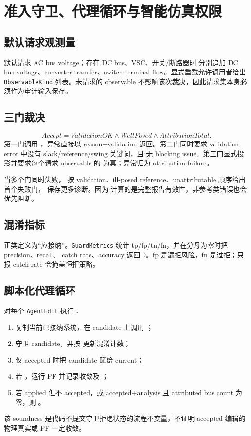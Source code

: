 \section{准入守卫、代理循环与智能仿真权限}

\subsection{默认请求观测量}

 默认请求 AC bus voltage；存在 DC bus、VSC、开关/断路器时
分别追加 DC bus voltage、converter transfer、switch terminal flow。显式重载允许调用者给出
\texttt{ObservableKind} 列表。未请求的 observable 不影响该次裁决，因此请求集本身必须作为审计输入保存。

\subsection{三门裁决}

\begin{equation}
Accept=ValidationOK\land WellPosed\land AttributionTotal.
\end{equation}
第一门调用 ，异常直接以 reason=validation 返回。第二门同时要求 validation error
中没有 slack/reference/swing 关键词，且
 无 blocking issue。第三门显式投影并要求每个请求
observable 的  为真；异常归为 attribution failure。

当多个门同时失败， 按 validation、ill-posed reference、unattributable 顺序给出首个失败门，
 保存更多诊断。因为  计算的是完整报告有效性，非参考类错误也会优先阻断。

\subsection{混淆指标}

正类定义为“应接纳”。\texttt{GuardMetrics} 统计 tp/fp/tn/fn，并在分母为零时把 precision、recall、
catch rate、accuracy 返回 0。fp 是漏拒风险，fn 是过拒；只报 catch rate 会掩盖恒拒策略。

\subsection{脚本化代理循环}

 对每个 \texttt{AgentEdit} 执行：
\begin{enumerate}
  \item 复制当前已接纳系统，在 candidate 上调用 ；
  \item 守卫 candidate，并按  更新混淆计数；
  \item 仅 accepted 时把 candidate 赋给 current；
  \item 若 ，运行 PF 并记录收敛及 ；
  \item 若 applied 但不 accepted，或 accepted+analysis 且 attributed bus count 为零，则 。
\end{enumerate}
该 soundness 是代码不提交守卫拒绝状态的流程不变量，不证明 accepted 编辑的物理真实或 PF 一定收敛。


